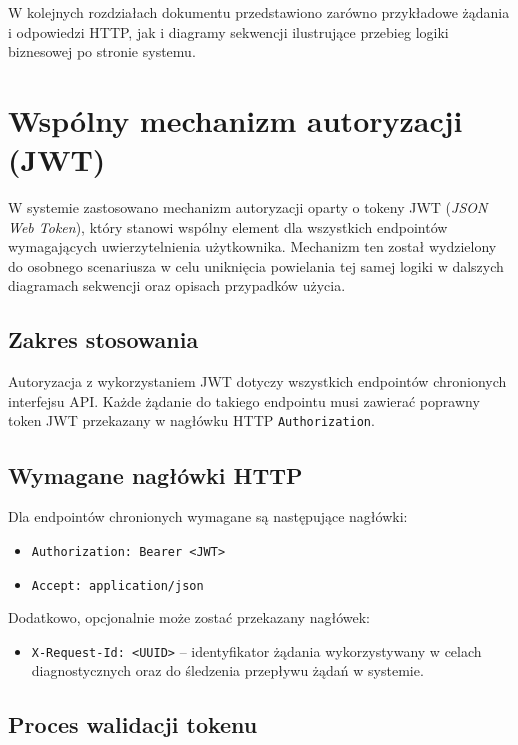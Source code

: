 \documentclass[11pt, a4paper]{article}
\begin{document}
W kolejnych rozdziałach dokumentu przedstawiono zarówno przykładowe żądania
i odpowiedzi HTTP, jak i diagramy sekwencji ilustrujące przebieg logiki biznesowej
po stronie systemu.


\section{Wspólny mechanizm autoryzacji (JWT)}

W systemie zastosowano mechanizm autoryzacji oparty o tokeny JWT
(\textit{JSON Web Token}), który stanowi wspólny element dla wszystkich
endpointów wymagających uwierzytelnienia użytkownika.
Mechanizm ten został wydzielony do osobnego scenariusza w celu uniknięcia
powielania tej samej logiki w dalszych diagramach sekwencji oraz opisach
przypadków użycia.

\subsection{Zakres stosowania}

Autoryzacja z wykorzystaniem JWT dotyczy wszystkich endpointów chronionych
interfejsu API. Każde żądanie do takiego endpointu musi zawierać poprawny token
JWT przekazany w nagłówku HTTP \texttt{Authorization}.

\subsection{Wymagane nagłówki HTTP}

Dla endpointów chronionych wymagane są następujące nagłówki:

\begin{itemize}
    \item \texttt{Authorization: Bearer <JWT>}
    \item \texttt{Accept: application/json}
\end{itemize}

Dodatkowo, opcjonalnie może zostać przekazany nagłówek:

\begin{itemize}
    \item \texttt{X-Request-Id: <UUID>} – identyfikator żądania wykorzystywany
    w celach diagnostycznych oraz do śledzenia przepływu żądań w systemie.
\end{itemize}

\subsection{Proces walidacji tokenu}
\end{document}
